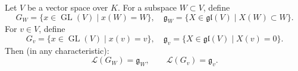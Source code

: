 Let $V$ be a vector space over $K$. For a subspace $W \subset V$, define
$$G_W = \{x \in \operatorname{GL}(V) \mid x(W) = W\}, \quad \mathfrak{g}_W = \{X \in \mathfrak{gl}(V) \mid X(W) \subset W\}.$$
For $v \in V$, define
$$G_v = \{x \in \operatorname{GL}(V) \mid x(v) = v\}, \quad \mathfrak{g}_v = \{X \in \mathfrak{gl}(V) \mid X(v) = 0\}.$$
Then (in any characteristic):
$$\mathcal{L}(G_W) = \mathfrak{g}_W, \qquad \mathcal{L}(G_v) = \mathfrak{g}_v.$$
